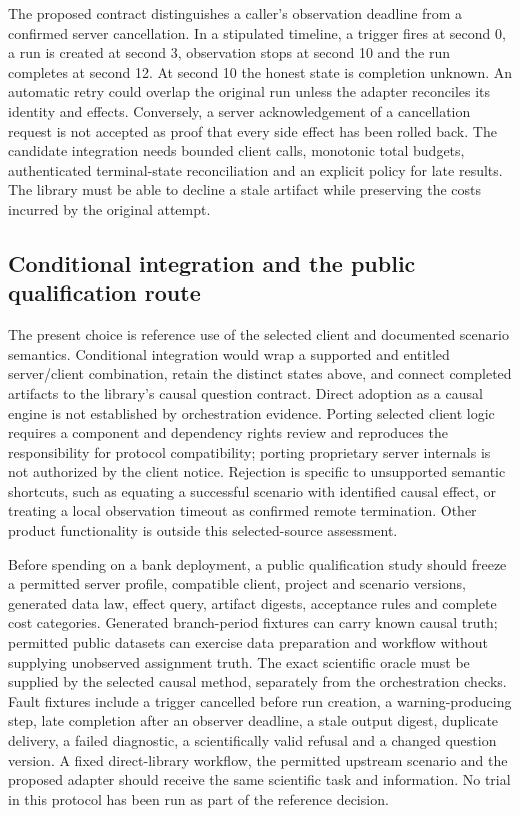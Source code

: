 The proposed contract distinguishes a caller's observation deadline from a
confirmed server cancellation. In a stipulated timeline, a trigger fires at
second 0, a run is created at second 3, observation stops at second 10 and the
run completes at second 12. At second 10 the honest state is completion
unknown. An automatic retry could overlap the original run unless the adapter
reconciles its identity and effects. Conversely, a server acknowledgement of
a cancellation request is not accepted as proof that every side effect has
been rolled back. The candidate integration needs bounded client calls,
monotonic total budgets, authenticated terminal-state reconciliation and an
explicit policy for late results. The library must be able to decline a stale
artifact while preserving the costs incurred by the original attempt.~\citep{exec25_dataiku_choice}

\subsection{Conditional integration and the public qualification route}
The present choice is reference use of the selected client and documented
scenario semantics. Conditional integration would wrap a supported and
entitled server/client combination, retain the distinct states above, and
connect completed artifacts to the library's causal question contract. Direct
adoption as a causal engine is not established by orchestration evidence.
Porting selected client logic requires a component and dependency rights
review and reproduces the responsibility for protocol compatibility; porting
proprietary server internals is not authorized by the client notice. Rejection
is specific to unsupported semantic shortcuts, such as equating a successful
scenario with identified causal effect, or treating a local observation timeout
as confirmed remote termination. Other product functionality is outside this
selected-source assessment.~\citep{exec24_workflow_contracts_dataiku,exec25_dataiku_choice}

Before spending on a bank deployment, a public qualification study should
freeze a permitted server profile, compatible client, project and scenario
versions, generated data law, effect query, artifact digests, acceptance rules
and complete cost categories. Generated branch-period fixtures can carry known
causal truth; permitted public datasets can exercise data preparation and
workflow without supplying unobserved assignment truth. The exact scientific
oracle must be supplied by the selected causal method, separately from the
orchestration checks. Fault fixtures include a trigger cancelled before run
creation, a warning-producing step, late completion after an observer deadline,
a stale output digest, duplicate delivery, a failed diagnostic, a scientifically
valid refusal and a changed question version. A fixed direct-library workflow,
the permitted upstream scenario and the proposed adapter should receive the
same scientific task and information. No trial in this protocol has been run
as part of the reference decision.~\citep{exec25_dataiku_choice}

